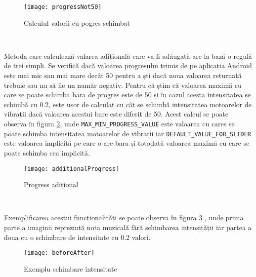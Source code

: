 \documentclass[../IoMusT.tex]{subfiles}
\begin{document}
\begin{figure}[h]
\centering
\texttt{[image: progressNot50]}
\caption{Calculul valorii cu pogres schimbat}
\label{fig:not50}
\end{figure} 
\\
\par Metoda care calculează valarea adițională care va fi adăugată are la bază o regulă de trei simpli. Se verifică dacă valoarea progresului trimis de pe aplicația Android este mai mic sau mai mare decât 50 pentru a ști dacă noua valoarea returnată trebuie sau nu să fie un număr negativ. Pentru că știm că valoarea maximă cu care se poate schimba bara de progres este de 50 și în cazul acesta intensitatea se schimbă cu 0.2, este ușor de calculat cu cât se schimbă intensitatea motoarelor de vibrații dacă valoarea acestui bare este diferit de 50.
Acest calcul se poate observa în figura \ref{fig:additionalProgress}, unde \verb|MAX_MIN_PROGRESS_VALUE| este valoarea cu cares se poate schimba intensitatea motoarelor de vibrații iar \verb|DEFAULT_VALUE_FOR_SLIDER| este valoarea implicită pe care o are bara și totodată valoarea maximă cu care se poate schimba cea implicită.
\begin{figure}[h]
\centering
\texttt{[image: additionalProgress]}
\caption{Progress adițional}
\label{fig:additionalProgress}
\end{figure} 
\\
\par Exemplificarea acestui funcționalități se poate observa în figura \ref{fig:beforeAfter} , unde prima parte a imaginii reprezintă nota muzicală fără schimbarea intensității iar partea a doua cu o schimbare de intensitate cu 0.2 valori.
\begin{figure}[h]
\centering
\texttt{[image: beforeAfter]}
\caption{Exemplu schimbare intensitate}
\label{fig:beforeAfter}
\end{figure} 
\end{document}

